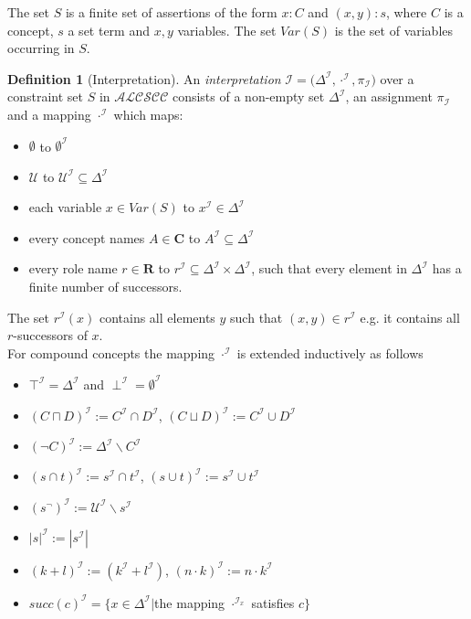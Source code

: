 \documentclass[a4paper,11pt]{scrartcl}
\theoremstyle{break}
\theoremstyle{definition}
\newtheorem{mydef}{Definition}
\begin{document}
The set $S$ is a finite set of assertions of the form $x:C$ and $(x,y):s$, where $C$ is a concept, $s$ a set term and $x,y$ variables. The set $Var(S)$ is the set of variables occurring in $S$.
\begin{mydef}[Interpretation]
An \textit{interpretation} $\mathcal{I=(\Delta^\mathcal{I},\cdot^\mathcal{I}},\pi_\mathcal{I})$ over a constraint set $S$ in $\mathcal{ALCSCC}$ consists of a non-empty set $\Delta^\mathcal{I}$, an assignment $\pi_\mathcal{I}$ and a mapping $\cdot^\mathcal{I}$ which maps:
\begin{itemize}
\item $\emptyset$ to $\emptyset^\mathcal{I}$
\item $\mathcal{U}$ to $\mathcal{U}^\mathcal{I}\subseteq \Delta^\mathcal{I}$
\item each variable $x\in Var(S)$ to $x^\mathcal{I}\in \Delta^\mathcal{I}$
\item every concept names $A\in\mathbf{C}$ to $A^\mathcal{I}\subseteq \Delta^\mathcal{I}$
\item every role name $r\in\mathbf{R}$ to $r^\mathcal{I}\subseteq\Delta^\mathcal{I}\times\Delta^\mathcal{I}$, such that every element in $\Delta^\mathcal{I}$ has a finite number of successors.
\end{itemize}
The set $r^\mathcal{I}(x)$ contains all elements $y$ such that $(x,y)\in r^\mathcal{I}$ e.g. it contains all $r$-successors of $x$.\\
For compound concepts the mapping $\cdot^\mathcal{I}$ is extended inductively as follows
\begin{itemize}
\item $\top^\mathcal{I}=\Delta^\mathcal{I}$ and $\perp^\mathcal{I}=\emptyset^\mathcal{I}$
\item $(C\sqcap D)^\mathcal{I}:=C^\mathcal{I}\cap D^\mathcal{I}$, $(C\sqcup D)^\mathcal{I}:=C^\mathcal{I}\cup D^\mathcal{I}$
\item $(\neg C)^\mathcal{I}:=\Delta^\mathcal{I}\backslash C^\mathcal{I}$
\item $(s\cap t)^\mathcal{I}:= s^\mathcal{I}\cap t^\mathcal{I}$, $(s\cup t)^\mathcal{I}:= s^\mathcal{I}\cup t^\mathcal{I}$
\item $(s^\neg)^\mathcal{I}:=\mathcal{U}^\mathcal{I}\backslash s^\mathcal{I}$
\item $|s|^\mathcal{I}:=|s^\mathcal{I}|$
\item $(k+l)^\mathcal{I}:=(k^\mathcal{I}+l^\mathcal{I})$, $(n\cdot k)^\mathcal{I}:= n\cdot k^\mathcal{I}$
\item $succ(c)^\mathcal{I}=\{x\in \Delta^\mathcal{I}|$the mapping $\cdot^{\mathcal{I}_x}$ satisfies $c\}$

\end{itemize}
\end{mydef}
\end{document}

